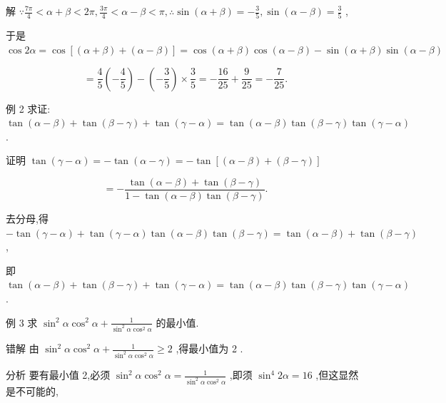 \documentclass[10pt]{article}
\begin{document}
解 \(\because \frac{7\pi }{4} < \alpha  + \beta  < {2\pi },\frac{3\pi }{4} < \alpha  - \beta  < \pi ,\therefore \sin \left( {\alpha  + \beta }\right)  =  - \frac{3}{5},\sin \left( {\alpha  - \beta }\right)  = \frac{3}{5}\) ,

于是 \(\cos {2\alpha } = \cos \left\lbrack  {\left( {\alpha  + \beta }\right)  + \left( {\alpha  - \beta }\right) }\right\rbrack   = \cos \left( {\alpha  + \beta }\right) \cos \left( {\alpha  - \beta }\right)  - \sin \left( {\alpha  + \beta }\right) \sin \left( {\alpha  - \beta }\right)\)

\[
= \frac{4}{5}\left( {-\frac{4}{5}}\right)  - \left( {-\frac{3}{5}}\right)  \times  \frac{3}{5} =  - \frac{16}{25} + \frac{9}{25} =  - \frac{7}{25}.
\]

例 2 求证: \(\tan \left( {\alpha  - \beta }\right)  + \tan \left( {\beta  - \gamma }\right)  + \tan \left( {\gamma  - \alpha }\right)  = \tan \left( {\alpha  - \beta }\right) \tan \left( {\beta  - \gamma }\right) \tan \left( {\gamma  - \alpha }\right)\) .

证明 \(\tan \left( {\gamma  - \alpha }\right)  =  - \tan \left( {\alpha  - \gamma }\right)  =  - \tan \left\lbrack  {\left( {\alpha  - \beta }\right)  + \left( {\beta  - \gamma }\right) }\right\rbrack\)

\[
=  - \frac{\tan \left( {\alpha  - \beta }\right)  + \tan \left( {\beta  - \gamma }\right) }{1 - \tan \left( {\alpha  - \beta }\right) \tan \left( {\beta  - \gamma }\right) }.
\]

去分母,得 \(- \tan \left( {\gamma  - \alpha }\right)  + \tan \left( {\gamma  - \alpha }\right) \tan \left( {\alpha  - \beta }\right) \tan \left( {\beta  - \gamma }\right)  = \tan \left( {\alpha  - \beta }\right)  + \tan \left( {\beta  - \gamma }\right)\) ,

即 \(\tan \left( {\alpha  - \beta }\right)  + \tan \left( {\beta  - \gamma }\right)  + \tan \left( {\gamma  - \alpha }\right)  = \tan \left( {\alpha  - \beta }\right) \tan \left( {\beta  - \gamma }\right) \tan \left( {\gamma  - \alpha }\right)\) .

例 3 求 \({\sin }^{2}\alpha {\cos }^{2}\alpha  + \frac{1}{{\sin }^{2}\alpha {\cos }^{2}\alpha }\) 的最小值.

错解 由 \({\sin }^{2}\alpha {\cos }^{2}\alpha  + \frac{1}{{\sin }^{2}\alpha {\cos }^{2}\alpha } \geq  2\) ,得最小值为 2 .

分析 要有最小值 2,必须 \({\sin }^{2}\alpha {\cos }^{2}\alpha  = \frac{1}{{\sin }^{2}\alpha {\cos }^{2}\alpha }\) ,即须 \({\sin }^{4}{2\alpha } = {16}\) ,但这显然是不可能的,
\end{document}
